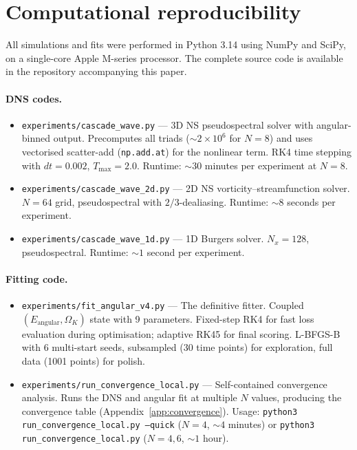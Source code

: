 \documentclass[11pt,a4paper]{article}
\theoremstyle{remark}
\begin{document}
\appendix

\section{Computational reproducibility}\label{app:code}

All simulations and fits were performed in Python 3.14 using NumPy and SciPy, on a single-core Apple M-series processor.  The complete source code is available in the repository accompanying this paper.

\paragraph{DNS codes.}
\begin{itemize}
\item \texttt{experiments/cascade\_wave.py} --- 3D NS pseudospectral solver with angular-binned output.  Precomputes all triads ($\sim 2 \times 10^6$ for $N=8$) and uses vectorised scatter-add (\texttt{np.add.at}) for the nonlinear term.  RK4 time stepping with $dt = 0.002$, $T_{\max} = 2.0$.  Runtime: $\sim 30$ minutes per experiment at $N = 8$.
\item \texttt{experiments/cascade\_wave\_2d.py} --- 2D NS vorticity--streamfunction solver.  $N = 64$ grid, pseudospectral with $2/3$-dealiasing.  Runtime: $\sim 8$ seconds per experiment.
\item \texttt{experiments/cascade\_wave\_1d.py} --- 1D Burgers solver.  $N_x = 128$, pseudospectral.  Runtime: $\sim 1$ second per experiment.
\end{itemize}

\paragraph{Fitting code.}
\begin{itemize}
\item \texttt{experiments/fit\_angular\_v4.py} --- The definitive fitter.  Coupled $(E_{\mathrm{angular}}, \Omega_K)$ state with 9 parameters.  Fixed-step RK4 for fast loss evaluation during optimisation; adaptive RK45 for final scoring.  L-BFGS-B with 6 multi-start seeds, subsampled (30 time points) for exploration, full data (1001 points) for polish.
\item \texttt{experiments/run\_convergence\_local.py} --- Self-contained convergence analysis.  Runs the DNS and angular fit at multiple $N$ values, producing the convergence table (Appendix~\ref{app:convergence}).  Usage: \texttt{python3 run\_convergence\_local.py ---quick} ($N = 4$, $\sim 4$ minutes) or \texttt{python3 run\_convergence\_local.py} ($N = 4, 6$, $\sim 1$ hour).
\end{itemize}
\end{document}
